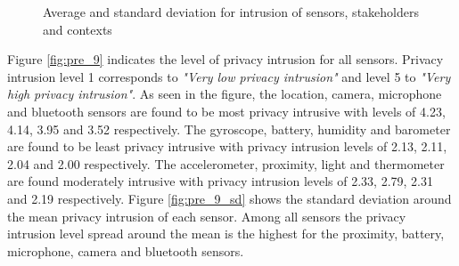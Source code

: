 \begin{figure}[htp]
\hspace{1em}
\newline
\caption{Average and standard deviation for intrusion of sensors, stakeholders and contexts }
\label{fig:st3}
\end{figure}

Figure \ref{fig:pre_9} indicates the level of privacy intrusion for all sensors. Privacy intrusion level 1 corresponds to \textit{"Very low privacy intrusion"} and level 5 to \textit{"Very high privacy intrusion"}. As seen in the figure, the location, camera, microphone and bluetooth sensors are found to be most privacy intrusive with levels of 4.23, 4.14, 3.95 and 3.52 respectively. The gyroscope, battery, humidity and barometer are found to be least privacy intrusive with privacy intrusion levels of 2.13, 2.11, 2.04 and 2.00 respectively. The accelerometer, proximity, light and thermometer are found moderately intrusive with privacy intrusion levels of 2.33, 2.79, 2.31 and 2.19 respectively. Figure \ref{fig:pre_9_sd} shows the standard deviation around the mean privacy intrusion of each sensor. Among all sensors the privacy intrusion level spread around the mean is the highest for the proximity, battery, microphone, camera and bluetooth sensors.

